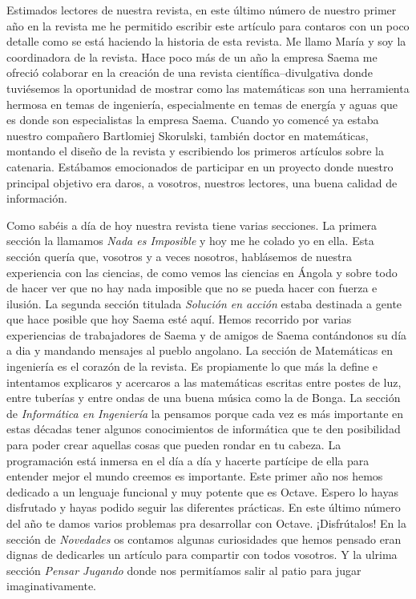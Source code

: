 \begin{multicols}{2}

 
  \cappar Estimados lectores de nuestra revista, en este último número
  de nuestro primer año en la revista me he permitido escribir este
  artículo para contaros con un poco detalle como se está haciendo la
  historia de esta revista. Me llamo María y soy la coordinadora de la
  revista. Hace poco más de un año la empresa Saema me ofreció
  colaborar en la creación de una revista científica--divulgativa
  donde tuviésemos la oportunidad de mostrar como las matemáticas son
  una herramienta hermosa en temas de ingeniería, especialmente en
  temas de energía y aguas que es donde son especialistas la empresa
  Saema. Cuando yo comencé ya estaba nuestro compañero Bartlomiej
  Skorulski, también doctor en matemáticas, montando el diseño de la
  revista y escribiendo los primeros artículos sobre la
  catenaria. Estábamos emocionados de participar en un proyecto donde
  nuestro principal objetivo era daros, a vosotros, nuestros lectores,
  una buena calidad de información.

  Como sabéis a día de hoy nuestra revista tiene varias secciones. La
  primera sección la llamamos \emph{Nada es Imposible} y hoy me he
  colado yo en ella. Esta sección quería que, vosotros y a veces
  nosotros, hablásemos de nuestra experiencia con las ciencias, de
  como vemos las ciencias en Ángola y sobre todo de hacer ver que no
  hay nada imposible que no se pueda hacer con fuerza e ilusión. La
  segunda sección titulada \emph{Solución en acción} estaba destinada
  a gente que hace posible que hoy Saema esté aquí. Hemos recorrido
  por varias experiencias de trabajadores de Saema y de amigos de
  Saema contándonos su día a dia y mandando mensajes al pueblo
  angolano. La sección de Matemáticas en ingeniería es el corazón de
  la revista. Es propiamente lo que más la define e intentamos
  explicaros y acercaros a las matemáticas escritas entre postes de
  luz, entre tuberías y entre ondas de una buena música como la de
  Bonga. La sección de \emph{Informática en Ingeniería} la pensamos
  porque cada vez es más importante en estas décadas tener algunos
  conocimientos de informática que te den posibilidad para poder crear
  aquellas cosas que pueden rondar en tu cabeza. La programación está
  inmersa en el día a día y hacerte partícipe de ella para entender
  mejor el mundo creemos es importante. Este primer año nos hemos
  dedicado a un lenguaje funcional y muy potente que es Octave. Espero
  lo hayas disfrutado y hayas podido seguir las diferentes
  prácticas. En este último número del año te damos varios problemas
  pra desarrollar con Octave. ¡Disfrútalos!  En la sección de
  \emph{Novedades} os contamos algunas curiosidades que hemos pensado eran
  dignas de dedicarles un artículo para compartir con todos
  vosotros. Y la ulrima sección \emph{Pensar Jugando} donde nos
  permitíamos salir al patio para jugar imaginativamente.


\end{multicols}
